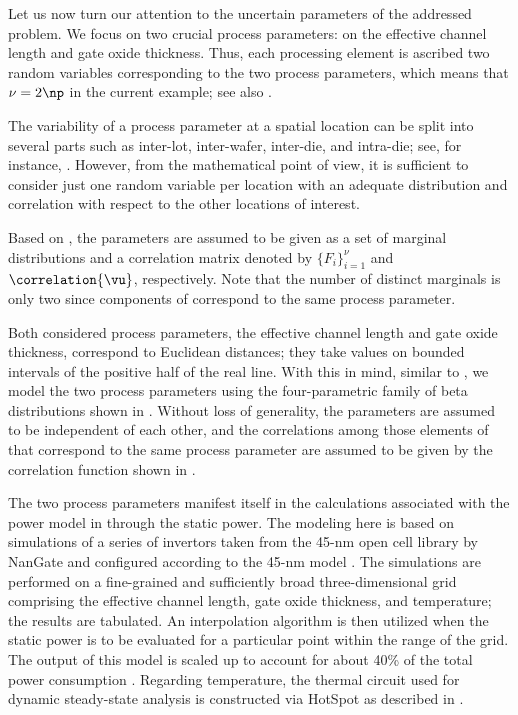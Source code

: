Let us now turn our attention to the uncertain parameters \vu of the addressed
problem. We focus on two crucial process parameters: on the effective channel
length and gate oxide thickness. Thus, each processing element is ascribed two
random variables corresponding to the two process parameters, which means that
$\nu = 2 \np$ in the current example; see also .

\begin{remark}
The variability of a process parameter at a spatial location can be split into
several parts such as inter-lot, inter-wafer, inter-die, and intra-die; see, for
instance, \cite{juan2012}. However, from the mathematical point of view, it is
sufficient to consider just one random variable per location with an adequate
distribution and correlation with respect to the other locations of interest.
\end{remark}

Based on , the parameters \vu are assumed to be given as
a set of marginal distributions and a correlation matrix denoted by $\{ F_i
\}_{i = 1}^\nu$ and $\correlation{\vu}$, respectively. Note that the number of
distinct marginals is only two since \np components of \vu correspond to the
same process parameter.

Both considered process parameters, the effective channel length and gate oxide
thickness, correspond to Euclidean distances; they take values on bounded
intervals of the positive half of the real line. With this in mind, similar to
, we model the two process parameters using
the four-parametric family of beta distributions shown in
. Without loss of generality, the parameters are assumed
to be independent of each other, and the correlations among those elements of
\vu that correspond to the same process parameter are assumed to be given by the
correlation function shown in .

The two process parameters manifest itself in the calculations associated with
the power model in  through the static power. The
modeling here is based on  simulations of a series of 
invertors taken from the 45-nm open cell library by NanGate \cite{nangate} and
configured according to the 45-nm   model \cite{ptm}. The
simulations are performed on a fine-grained and sufficiently broad
three-dimensional grid comprising the effective channel length, gate oxide
thickness, and temperature; the results are tabulated. An interpolation
algorithm is then utilized when the static power is to be evaluated for a
particular point within the range of the grid. The output of this model is
scaled up to account for about 40\% of the total power consumption
\cite{liu2007}. Regarding temperature, the thermal  circuit used for
dynamic steady-state analysis is constructed via HotSpot \cite{skadron2003} as
described in .

